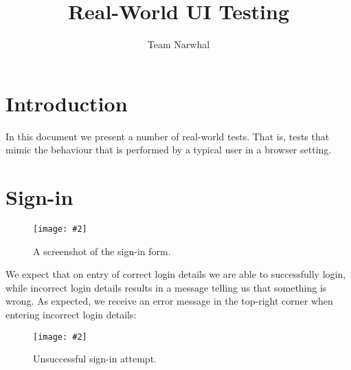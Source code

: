 \documentclass{article}
\title{Real-World UI Testing}
\author{Team Narwhal}
\date{}
\newcommand{\screen}[3]{
    \begin{figure}[h]
    \centering
    \texttt{[image: \#2]}
    \caption{#3}
    \end{figure}
}
\begin{document}
\maketitle

\section{Introduction}
In this document we present a number of real-world tests.
That is, tests that mimic the behaviour that is performed by a typical user in a browser setting.

\section{Sign-in}
\screen{0.8}{sign-in-form}{A screenshot of the sign-in form.}
We expect that on entry of correct login details we are able to successfully login, while incorrect login details results in a message telling us that something is wrong.
As expected, we receive an error message in the top-right corner when entering incorrect login details:
\screen{0.8}{sign-in-fail}{Unsuccessful sign-in attempt.}
\end{document}
